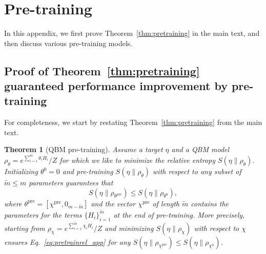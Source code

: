 \documentclass[
    aps,
    prx,
    onecolumn
]{revtex4-2}
\newtheorem{theorem}{Theorem}
\begin{document}
\section{Pre-training}

In this appendix, we first prove Theorem~\ref{thm:pretraining} in the main text, and then discuss various pre-training models. 

\subsection{Proof of Theorem~\ref{thm:pretraining} guaranteed performance improvement by pre-training}
\label{app:pretrainthm}
For completeness, we start by restating Theorem~\ref{thm:pretraining} from the main text. 

\begingroup
\def\thetheorem{3}
\begin{theorem}[QBM pre-training]
    Assume a target $\eta$ and a QBM model $\rho_\theta=e^{\sum_{i=1}^m \theta_i H_i}/Z$ for which we like to minimize the relative entropy $S(\eta \|\rho_\theta)$. Initializing $\theta^0=0$ and pre-training $S(\eta\| \rho_\theta)$ with respect to any subset of $\tilde{m} \leq m $ parameters guarantees that 
    \begin{equation}
    \label{eq:pretrainrel_app}
         S(\eta \|\rho_{\theta^\mathrm{pre}}) \leq S(\eta \|\rho_{\theta^0}), 
    \end{equation} 
    where $\theta^\mathrm{pre} = [\chi^{\mathrm{pre}}, 0_{m-\tilde{m}}]$ and the vector $\chi^{\mathrm{pre}}$ of length $\tilde{m}$ contains the parameters for the terms $\{H_i\}_{i=1}^{\tilde{m}}$ at the end of pre-training.
    More precisely, starting from $\rho_\chi=e^{\sum_{i=1}^{\tilde{m}} \chi_i H_i}/Z$ and minimizing $S(\eta \|\rho_\chi)$ with respect to $\chi$ ensures Eq.~\eqref{eq:pretrainrel_app} for any $S(\eta \|\rho_{\chi^{\mathrm{pre}}})\leq S(\eta \|\rho_{\chi^0})$.
\end{theorem}
\endgroup
\end{document}

